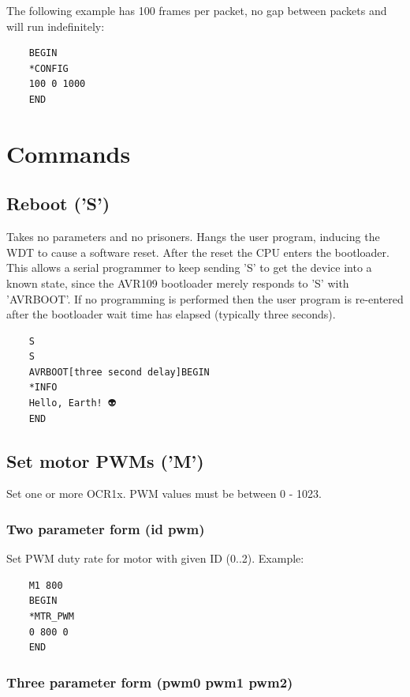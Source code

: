 \documentclass{article}
\begin{document}
The following example has 100 frames per packet, no gap between packets and will run indefinitely:

\begin{lstlisting}
    BEGIN
    *CONFIG
    100 0 1000
    END
\end{lstlisting}

\section{Commands}

\subsection{Reboot ('S')}

Takes no parameters and no prisoners.
Hangs the user program, inducing the WDT to cause a software reset.
After the reset the CPU enters the bootloader.
This allows a serial programmer to keep sending 'S' to get the device into a known state,
since the AVR109 bootloader merely responds to 'S' with 'AVRBOOT'.
If no programming is performed then the user program is re-entered after the bootloader wait time has elapsed (typically three seconds).

\begin{lstlisting}
    S
    S
    AVRBOOT[three second delay]BEGIN
    *INFO
    Hello, Earth! 👽
    END
\end{lstlisting}


\subsection{Set motor PWMs ('M')}

Set one or more OCR1x.
PWM values must be between 0 - 1023.

\subsubsection{Two parameter form (id pwm)}

Set PWM duty rate for motor with given ID (0..2). Example:

\begin{lstlisting}
    M1 800
    BEGIN
    *MTR_PWM
    0 800 0
    END
\end{lstlisting}

\subsubsection{Three parameter form (pwm0 pwm1 pwm2)}
\end{document}
